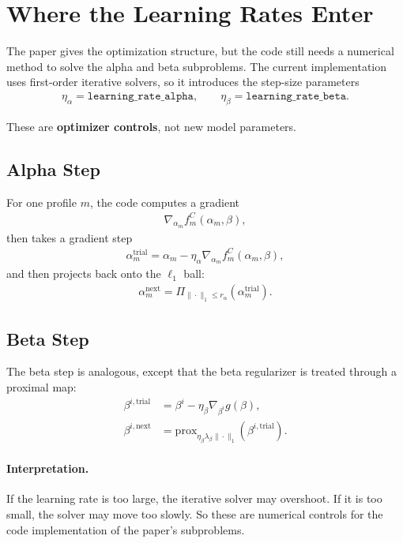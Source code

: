 \documentclass[11pt]{article}
\begin{document}
\section{Where the Learning Rates Enter}
The paper gives the optimization structure, but the code still needs a
numerical method to solve the alpha and beta subproblems. The current
implementation uses first-order iterative solvers, so it introduces the
step-size parameters
\begin{align}
\eta_\alpha = \texttt{learning\_rate\_alpha},
\qquad
\eta_\beta = \texttt{learning\_rate\_beta}.
\end{align}

These are \textbf{optimizer controls}, not new model parameters.

\subsection{Alpha Step}
For one profile $m$, the code computes a gradient
\begin{align}
\nabla_{\alpha_m} f_m^C(\alpha_m,\beta),
\end{align}
then takes a gradient step
\begin{align}
\alpha_m^{\mathrm{trial}}
=
\alpha_m - \eta_\alpha \nabla_{\alpha_m} f_m^C(\alpha_m,\beta),
\end{align}
and then projects back onto the $\ell_1$ ball:
\begin{align}
\alpha_m^{\mathrm{next}}
=
\Pi_{\|\cdot\|_1 \le r_\alpha}
\left(
\alpha_m^{\mathrm{trial}}
\right).
\end{align}

\subsection{Beta Step}
The beta step is analogous, except that the beta regularizer is treated through
a proximal map:
\begin{align}
\beta^{i,\mathrm{trial}}
&=
\beta^i - \eta_\beta \nabla_{\beta^i} g(\beta), \\
\beta^{i,\mathrm{next}}
&=
\mathrm{prox}_{\eta_\beta \lambda_\beta \|\cdot\|_1}
\left(
\beta^{i,\mathrm{trial}}
\right).
\end{align}

\paragraph{Interpretation.}
If the learning rate is too large, the iterative solver may overshoot. If it is
too small, the solver may move too slowly. So these are numerical controls for
the code implementation of the paper's subproblems.
\end{document}
